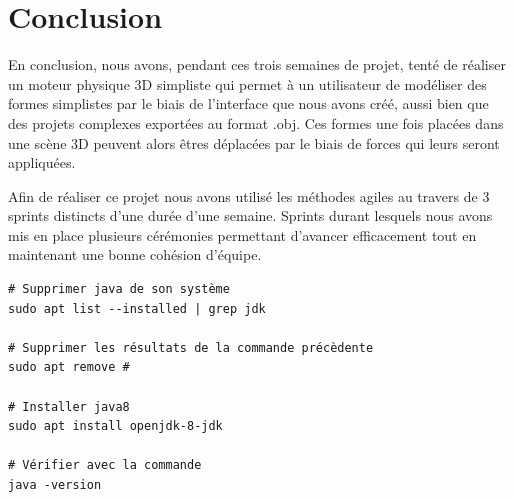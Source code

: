 \documentclass[11pt]{report}
\begin{document}
\chapter{Conclusion}

En conclusion, nous avons, pendant ces trois semaines de projet, tenté de réaliser un moteur physique 3D simpliste qui permet à un utilisateur de modéliser des formes simplistes par le biais de l'interface que nous avons créé, aussi bien que des projets complexes exportées au format .obj. Ces formes une fois placées dans une scène 3D peuvent alors êtres déplacées par le biais de forces qui leurs seront appliquées.\newline

Afin de réaliser ce projet nous avons utilisé les méthodes agiles au travers de 3 sprints distincts d'une durée d'une semaine. Sprints durant lesquels nous avons mis en place plusieurs cérémonies permettant d'avancer efficacement tout en maintenant une bonne cohésion d'équipe.\newline

\begin{verbatim}
# Supprimer java de son système
sudo apt list --installed | grep jdk

# Supprimer les résultats de la commande précèdente
sudo apt remove #

# Installer java8
sudo apt install openjdk-8-jdk

# Vérifier avec la commande
java -version
\end{verbatim}
\end{document}
